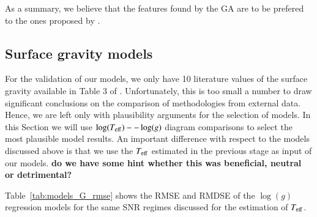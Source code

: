 As a summary, we believe that the features found by the GA are to be
prefered to the ones proposed by \cite{cesetti}.

\subsection{Surface gravity models}

For the validation of our models, we only have 10 literature values of
the surface gravity available in Table 3 of
\cite{cesetti}. Unfortunately, this is too small a number to draw
significant conclusions on the comparison of methodologies from
external data. Hence, we are left only with plausibility arguments for
the selection of models. In this Section we will use $\log(T_{\rm
  eff})--\log(g)$ diagram comparisons to select the most plausible
model results. An important difference with respect to the models
discussed above is that we use the $T_{\rm eff}$ estimated in the
previous stage as input of our models. {\bf do we have some hint
  whether this was beneficial, neutral or detrimental?}

Table~\ref{tab:models_G_rmse} shows the RMSE and RMDSE of the
$\log(g)$ regression models for the same SNR regimes discussed for the
estimation of $T_{\rm eff}$.

